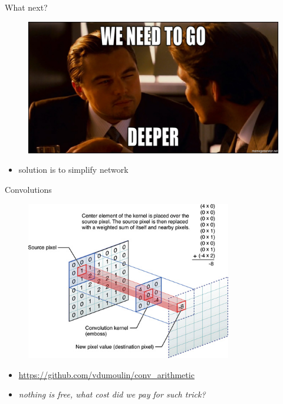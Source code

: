 \documentclass{beamer}
\begin{document}
\begin{frame}{What next?}

\begin{figure}[h!]
  \centering
  \includegraphics[width=1\textwidth]{images/inception.png}
\end{figure}

\begin{itemize}
\item solution is to simplify network
\end{itemize}

\end{frame}


\begin{frame}{Convolutions}

\begin{figure}[h!]
  \centering
  \includegraphics[width=0.8\textwidth]{images/kernel_convolution.jpg}
\end{figure}

\begin{itemize}
\item \url{https://github.com/vdumoulin/conv_arithmetic}
\item \textit{nothing is free, what cost did we pay for such trick?}
\end{itemize}

\end{frame}
\end{document}
